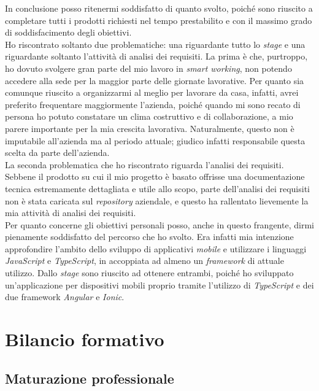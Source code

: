 In conclusione posso ritenermi soddisfatto di quanto svolto, poiché sono riuscito a completare tutti i prodotti richiesti nel tempo prestabilito e con il massimo grado di soddisfacimento degli obiettivi. \\
Ho riscontrato soltanto due problematiche: una riguardante tutto lo \textit{stage} e una riguardante soltanto l'attività di analisi dei requisiti. La prima è che, purtroppo, ho dovuto svolgere gran parte del mio lavoro in \textit{smart working}, non potendo accedere alla sede per la maggior parte delle giornate lavorative. Per quanto sia comunque riuscito a organizzarmi al meglio per lavorare da casa, infatti, avrei preferito frequentare maggiormente l'azienda, poiché quando mi sono recato di persona ho potuto constatare un clima costruttivo e di collaborazione, a mio parere importante per la mia crescita lavorativa. Naturalmente, questo non è imputabile all'azienda ma al periodo attuale; giudico infatti responsabile questa scelta da parte dell'azienda. \\
La seconda problematica che ho riscontrato riguarda l'analisi dei requisiti. Sebbene il prodotto su cui il mio progetto è basato offrisse una documentazione tecnica estremamente dettagliata e utile allo scopo, parte dell'analisi dei requisiti non è stata caricata sul \textit{repository} aziendale, e questo ha rallentato lievemente la mia attività di analisi dei requisiti. \\
Per quanto concerne gli obiettivi personali posso, anche in questo frangente, dirmi pienamente soddisfatto del percorso che ho svolto. Era infatti mia intenzione approfondire l'ambito dello sviluppo di applicativi \textit{mobile} e utilizzare i linguaggi \textit{JavaScript} e \textit{TypeScript}, in accoppiata ad almeno un \textit{framework} di attuale utilizzo. Dallo \textit{stage} sono riuscito ad ottenere entrambi, poiché ho sviluppato un'applicazione per dispositivi mobili proprio tramite l'utilizzo di \textit{TypeScript} e dei due framework \textit{Angular} e \textit{Ionic}.



\section{Bilancio formativo}

\subsection{Maturazione professionale}


